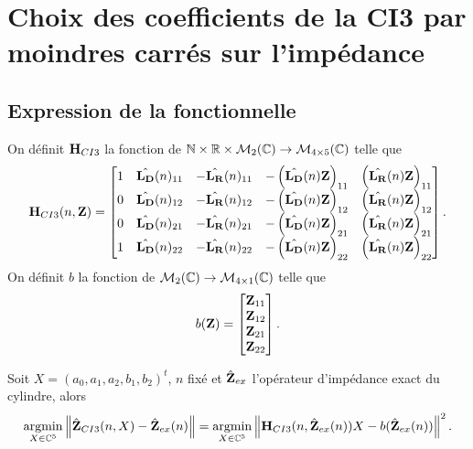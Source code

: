 \section[Choix 1 du calcul des coefficients de la CI3]{Choix des coefficients de la CI3 par moindres carrés sur l'impédance}

  \subsection{Expression de la fonctionnelle}

    \begin{defn}
      On définit \(\mathbf{H}_{CI3}\) la fonction de \(\mathbb N \times \mathbb R \times \mathcal{M}_2(\mathbb C) \rightarrow \mathcal{M}_{4\times5}(\mathbb C)\) telle que
      \begin{equation*}
        \mathbf{H}_{CI3}(n,\mathbf{Z}) = \begin{bmatrix}
        1 & \hat{\mathbf{L_D}}(n)_{11} & -\hat{\mathbf{L_R}}(n)_{11} & -\left(\hat{\mathbf{L_D}}(n){\mathbf{Z}}\right)_{11} & \left(\hat{\mathbf{L_R}}(n){\mathbf{Z}}\right)_{11}
        \\
        0 & \hat{\mathbf{L_D}}(n)_{12} & -\hat{\mathbf{L_R}}(n)_{12} & -\left(\hat{\mathbf{L_D}}(n){\mathbf{Z}}\right)_{12} & \left(\hat{\mathbf{L_R}}(n){\mathbf{Z}}\right)_{12}
        \\
        0 & \hat{\mathbf{L_D}}(n)_{21} & -\hat{\mathbf{L_R}}(n)_{21} & -\left(\hat{\mathbf{L_D}}(n){\mathbf{Z}}\right)_{21} & \left(\hat{\mathbf{L_R}}(n){\mathbf{Z}}\right)_{21}
        \\
        1 & \hat{\mathbf{L_D}}(n)_{22} & -\hat{\mathbf{L_R}}(n)_{22} & -\left(\hat{\mathbf{L_D}}(n){\mathbf{Z}}\right)_{22} & \left(\hat{\mathbf{L_R}}(n){\mathbf{Z}}\right)_{22}
        \end{bmatrix}.
      \end{equation*}
      On définit \(b\) la fonction de \(\mathcal{M}_2(\mathbb C) \rightarrow \mathcal{M}_{4\times1}(\mathbb C)\) telle que
      \begin{equation*}
        b(\mathbf{Z}) = \begin{bmatrix}
        {\mathbf{Z}}_{11}
        \\
        {\mathbf{Z}}_{12}
        \\
        {\mathbf{Z}}_{21}
        \\
        {\mathbf{Z}}_{22}
        \end{bmatrix}.
      \end{equation*}
    \end{defn}

    \begin{prop}
      Soit \(X = (a_0,a_1,a_2,b_1,b_2)^t\), \(n\) fixé et \(\hat{\mathbf{Z}}_{ex}\) l'opérateur d'impédance exact du cylindre, alors
      \begin{equation*}
        {\underset{X\in\mathbb C^5}{\operatorname{argmin}}} \left\lVert\hat{\mathbf{Z}}_{CI3}(n,X) - \hat{\mathbf{Z}}_{ex}(n)\right\rVert = {\underset{X\in\mathbb C^5}{\operatorname{argmin}}} \left\lVert\mathbf{H}_{CI3}(n,\hat{\mathbf{Z}}_{ex}(n))X - b(\hat{\mathbf{Z}}_{ex}(n))\right\rVert^2.
      \end{equation*}
    \end{prop}

